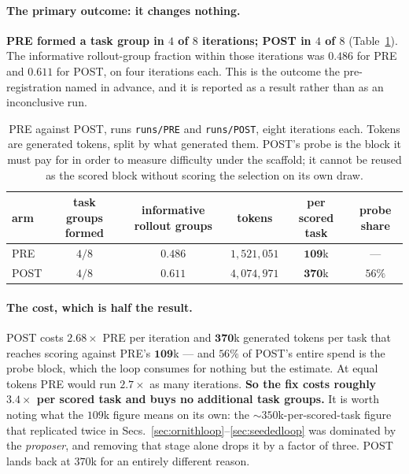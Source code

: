 \paragraph{The primary outcome: it changes nothing.}
\textbf{PRE formed a task group in $4$ of $8$ iterations; POST in $4$ of $8$}
(Table~\ref{tab:postpre}). The informative rollout-group fraction within those iterations was
$0.486$ for PRE and $0.611$ for POST, on four iterations each. This is the outcome the
pre-registration named in advance, and it is reported as a result rather than as an
inconclusive run.

\begin{table}[t]
\centering\small
\caption{PRE against POST, runs \texttt{runs/PRE} and \texttt{runs/POST}, eight iterations
each. Tokens are generated tokens, split by what generated them. POST's probe is the block it
must pay for in order to measure difficulty under the scaffold; it cannot be reused as the
scored block without scoring the selection on its own draw.}
\label{tab:postpre}
\begin{tabular}{lccccc}
\toprule
arm & task groups formed & informative rollout groups & tokens & per scored task & probe share \\
\midrule
PRE  & $4/8$ & $0.486$ & $1{,}521{,}051$ & $\mathbf{109}$k & --- \\
POST & $4/8$ & $0.611$ & $4{,}074{,}971$ & $\mathbf{370}$k & $56\%$ \\
\bottomrule
\end{tabular}
\end{table}

\paragraph{The cost, which is half the result.} POST costs $\mathbf{2.68\times}$ PRE per
iteration and $\mathbf{370}$k generated tokens per task that reaches scoring against PRE's
$\mathbf{109}$k --- and $56\%$ of POST's entire spend is the probe block, which the loop
consumes for nothing but the estimate. At equal tokens PRE would run $2.7\times$ as many
iterations. \textbf{So the fix costs roughly $3.4\times$ per scored task and buys no additional
task groups.} It is worth noting what the $109$k figure means on its own: the
$\sim\!350$k-per-scored-task figure that replicated twice in
Secs.~\ref{sec:ornithloop}--\ref{sec:seededloop} was dominated by the \emph{proposer}, and
removing that stage alone drops it by a factor of three. POST lands back at $370$k for an
entirely different reason.

